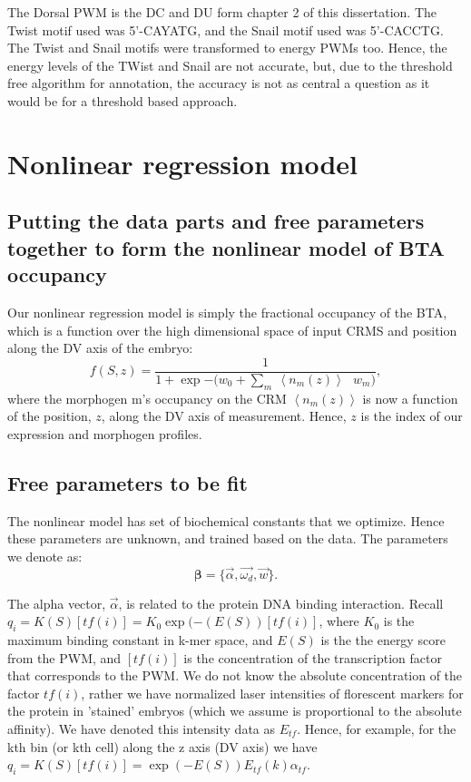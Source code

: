The Dorsal PWM is the DC and DU form chapter 2 of this dissertation.  The Twist motif used was 5'-CAYATG, and the Snail motif used was 5'-CACCTG.  The Twist and Snail motifs were transformed to energy PWMs too.  Hence, the energy levels of the TWist and Snail are not accurate, but, due to the threshold free algorithm for annotation, the accuracy is not as central a question as it would be for a threshold based approach.

\section{Nonlinear regression model }
\subsection{Putting the data parts and free parameters together to form the nonlinear model of BTA occupancy }
Our nonlinear regression model is simply the fractional occupancy of the BTA, which is a function over the high dimensional space of input CRMS and position along the DV axis of the embryo:
\begin{equation}\label{modelz}
f( S,z ) =  \frac{1}{1 + \exp{ -(w_{0} + \sum_{m}  \  \left< n_m(z) \right> \ \ \ w_{m}})},
\end{equation}
where the morphogen m's occupancy on the CRM $\left< n_m(z) \right>$ is now a function of the position, $z$, along the DV axis of measurement.  Hence, $z$ is the index of our expression and morphogen profiles.
 


\subsection{Free parameters to be fit}
  
The nonlinear model has set of biochemical constants that we optimize.  Hence these parameters are unknown, and trained based on the data.  The parameters we denote as:
\begin{equation}\label{freeparams}
        \mathbf{\beta}=\{ \overrightarrow{\alpha},\overrightarrow{\omega_{ d}} ,\overrightarrow{w} \}.
    \end{equation}
  
The alpha vector, $\overrightarrow{\alpha}$, is related to the protein DNA binding interaction.  Recall $q_i=K(S)[tf(i)] = K_0\exp{(-(E(S))}[tf(i)]$, where $K_0$ is the maximum binding constant in k-mer space, and $E(S)$ is the the energy score from the PWM, and $[tf(i)]$ is the concentration of the transcription factor that corresponds to the PWM.  We do not know the absolute concentration of the factor $tf(i)$, rather we have normalized laser intensities of florescent markers for the protein in 'stained' embryos (which we assume is proportional to the absolute affinity).  We have denoted this intensity data as $E_{tf}$.  Hence, for example, for the kth bin (or kth cell) along the z axis (DV axis) we have $q_i=K(S)[tf(i)] = \exp{(-E(S))}E_{tf}(k) \alpha_{tf}$.   

